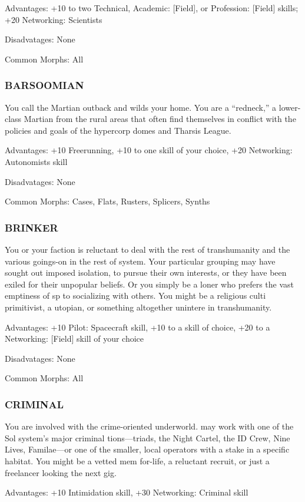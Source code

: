  Advantages: +10 to two Technical, Academic: [Field],
or Profession: [Field] skills; +20 Networking:
Scientists

 Disadvatages: None

 Common Morphs: All

\subsubsection{BARSOOMIAN}
You call the Martian outback and wilds your home.
You are a “redneck,” a lower-class Martian from the
rural areas that often find themselves in conflict with
the policies and goals of the hypercorp domes and Tharsis
League.

 Advantages: +10 Freerunning, +10 to one skill of your choice, +20 Networking: Autonomists skill

 Disadvatages: None

 Common Morphs: Cases, Flats, Rusters, Splicers, Synths

\subsubsection{BRINKER}
You or your faction is reluctant to deal with the rest of
transhumanity and the various goings-on in the rest of
system. Your particular grouping may have sought out
imposed isolation, to pursue their own interests, or they
have been exiled for their unpopular beliefs. Or you
simply be a loner who prefers the vast emptiness of sp
to socializing with others. You might be a religious culti
primitivist, a utopian, or something altogether unintere
in transhumanity.

 Advantages: +10 Pilot: Spacecraft skill, +10 to a skill of
choice, +20 to a Networking: [Field] skill of your choice

 Disadvatages: None

 Common Morphs: All

\subsubsection{CRIMINAL}
You are involved with the crime-oriented underworld.
may work with one of the Sol system’s major criminal
tions—triads, the Night Cartel, the ID Crew, Nine Lives,
Familae—or one of the smaller, local operators with a
stake in a specific habitat. You might be a vetted mem
for-life, a reluctant recruit, or just a freelancer looking
the next gig.

 Advantages: +10 Intimidation skill, +30 Networking: Criminal skill

